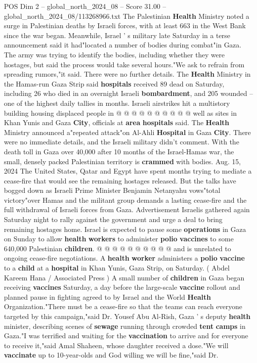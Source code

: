 \begin{textsample}{POS Dim 2 – global\_north\_2024\_08 – Score 31.00 – global\_north\_2024\_08/113268966.txt}
The Palestinian \textbf{Health} Ministry noted a surge in Palestinian deaths by Israeli forces, with at least 663 in the West Bank since the war began.
Meanwhile, Israel ' s military late Saturday in a terse announcement said it had"located a number of bodies during combat"in Gaza.
The army was trying to identify the bodies, including whether they were hostages, but said the process would take several hours."We ask to refrain from spreading rumors,"it said.
There were no further details.
The \textbf{Health} Ministry in the Hamas-run Gaza Strip said \textbf{hospitals} received 89 dead on Saturday, including 26 who died in an overnight Israeli \textbf{bombardment}, and 205 wounded -- one of the highest daily tallies in months.
Israeli airstrikes hit a multistory building housing displaced people in @ @ @ @ @ @ @ @ @ @ well as sites in Khan Yunis and Gaza \textbf{City}, officials at \textbf{area} \textbf{hospitals} said.
The \textbf{Health} Ministry announced a"repeated attack"on Al-Ahli \textbf{Hospital} in Gaza \textbf{City}.
There were no immediate details, and the Israeli military didn't comment.
With the death toll in Gaza over 40,000 after 10 months of the Israel-Hamas war, the small, densely packed Palestinian territory is \textbf{crammed} with bodies.
Aug. 15, 2024 The United States, Qatar and Egypt have spent months trying to mediate a cease-fire that would see the remaining hostages released.
But the talks have bogged down as Israeli Prime Minister Benjamin Netanyahu vows"total victory"over Hamas and the militant group demands a lasting cease-fire and the full withdrawal of Israeli forces from Gaza.
Advertisement Israelis gathered again Saturday night to rally against the government and urge a deal to bring remaining hostages home.
Israel is expected to pause some \textbf{operations} in Gaza on Sunday to allow \textbf{health} \textbf{workers} to administer \textbf{polio} \textbf{vaccines} to some 640,000 Palestinian \textbf{children}. @ @ @ @ @ @ @ @ @ @ and is unrelated to ongoing cease-fire negotiations.
A \textbf{health} \textbf{worker} administers a \textbf{polio} \textbf{vaccine} to a \textbf{child} at a \textbf{hospital} in Khan Yunis, Gaza Strip, on Saturday. ( Abdel Kareem Hana / Associated Press ) A small number of \textbf{children} in Gaza began receiving \textbf{vaccines} Saturday, a day before the large-scale \textbf{vaccine} rollout and planned pause in fighting agreed to by Israel and the World \textbf{Health} Organization."There must be a cease-fire so that the teams can reach everyone targeted by this campaign,"said Dr.
Yousef Abu Al-Rish, Gaza ' s deputy \textbf{health} minister, describing scenes of \textbf{sewage} running through crowded \textbf{tent} \textbf{camps} in Gaza."I was terrified and waiting for the \textbf{vaccination} to arrive and for everyone to receive it,"said Amal Shaheen, whose daughter received a dose."We will \textbf{vaccinate} up to 10-year-olds and God willing we will be fine,"said Dr.

\end{textsample}
